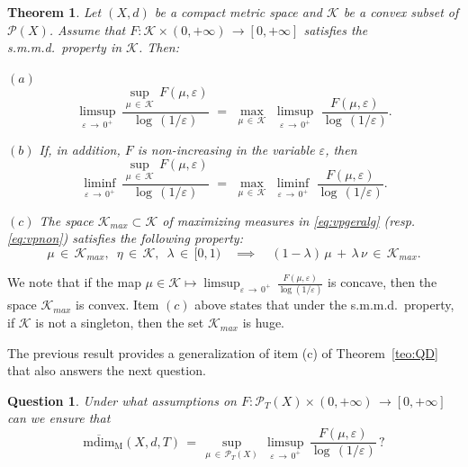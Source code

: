 \documentclass[11pt,a4paper,reqno]{amsart}
\theoremstyle{plain}
\newtheorem{maintheorem}{Theorem}
\theoremstyle{definition}
\newtheorem{question}[theorem]{Question}
\newcommand{\ep} {\varepsilon}
\newcommand{\vep}{\varepsilon}
\newcommand{\la} {\lambda}      \newcommand{\La}{\Lambda}
\newcommand{\cK}{{\mathcal K}}
\newcommand{\cP}{{\mathcal P}}
\begin{document}
\begin{maintheorem}\label{teo:VPg}
Let $(X,d)$ be a compact metric space and $\cK$ be a convex subset of $\cP(X)$. Assume that $F \colon \cK \times (0, +\infty)\, \to [0, +\infty]$ satisfies the s.m.m.d.~property in $\cK$. Then:
\smallskip

\noindent $(a)$
\begin{equation}\label{eq:vpgeralg}
\limsup_{\vep \, \to \, 0^+} \, \frac{\sup_{\mu \, \in \, \cK}\,F(\mu, \vep)}{\log \, (1/\vep)}
 \,\, =\,\, \max_{\mu\,\in\,\cK}\,\,  \limsup_{\vep \, \to \, 0^+} \, \,\frac{F(\mu, \vep)}{\log \,(1/\vep)}.    
 \end{equation}
\smallskip

\noindent $(b)$ If, in addition, $F$ is non-increasing in the variable $\ep$, then 
 \begin{equation}\label{eq:vpnon}
\liminf_{\vep \, \to \, 0^+} \, \frac{\sup_{\mu \, \in \, \cK}\,F(\mu, \vep)}{\log \, (1/\vep)}
 \,\, =\,\, \max_{\mu\,\in\,\cK}\,\,  \liminf_{\vep \, \to \, 0^+} \, \,\frac{F(\mu, \vep)}{\log \,(1/\vep)}.   
\end{equation}
\smallskip

\noindent $(c)$ The space $\cK_{max}\subset\cK$ of maximizing measures in \eqref{eq:vpgeralg} (resp. \eqref{eq:vpnon}) satisfies the following property: $$\mu\,\in\,\cK_{max}, \,\,\,\eta\,\in\,\cK,\,\,\,\la\,\in\,[0,1) \quad \implies\quad (1-\la)\,\mu\,+\,\la\,\nu\,\in\, \cK_{max}.$$
\end{maintheorem}

\medskip

We note that if the map $\mu \in \cK \mapsto \limsup_{\vep \, \to \, 0^+} \,\frac{F(\mu,\ep)}{\log(1/\ep)}$ is concave, then the space $\cK_{max}$ is convex. Item $(c)$ above states that under the s.m.m.d.~property, if $\cK$ is not a singleton, then the set $\cK_{max}$ is huge. 

\smallskip


The previous result provides a generalization of item (c) of Theorem~\ref{teo:QD} that also answers the next question.

\begin{question} \emph{Under what assumptions on $F\colon \cP_T(X) \times (0,+\infty) \,\to  [0, +\infty]$ can we ensure that
$$\mathrm{\overline{mdim}_M}(X,d,T) \, = \, \sup_{\mu \,\in\, \mathcal{P}_T(X)} \,\limsup_{\varepsilon \, \to \, 0^+}\,\frac{F(\mu, \vep)}{\log\,(1/\varepsilon)}\,?$$}
\end{question}
\end{document}
